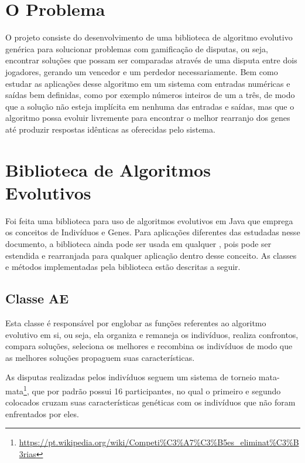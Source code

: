 \section{O Problema}

O projeto consiste do desenvolvimento de uma biblioteca de algoritmo evolutivo genérica para solucionar problemas com gamificação de disputas, ou seja, encontrar soluções que possam ser comparadas através de uma disputa entre dois jogadores, gerando um vencedor e um perdedor necessariamente. Bem como estudar as aplicações desse algoritmo em um sistema com entradas numéricas e saídas bem definidas, como por exemplo números inteiros de um a três, de modo que a solução não esteja implícita em nenhuma das entradas e saídas, mas que o algoritmo possa evoluir livremente para encontrar o melhor rearranjo dos genes até produzir respostas idênticas as oferecidas pelo sistema.

\section{Biblioteca de Algoritmos Evolutivos}

Foi feita uma biblioteca para uso de algoritmos evolutivos em Java que emprega os conceitos de Indivíduos e Genes. Para aplicações diferentes das estudadas nesse documento, a biblioteca ainda pode ser usada em qualquer \SE, pois pode ser estendida e rearranjada para qualquer aplicação dentro desse conceito. As classes e métodos implementadas pela biblioteca estão descritas a seguir.

\subsection{Classe AE}

Esta classe é responsável por englobar as funções referentes ao algoritmo evolutivo em si, ou seja, ela organiza e remaneja os indivíduos, realiza confrontos, compara soluções, seleciona os melhores e recombina os indivíduos de modo que as melhores soluções propaguem suas características.

As disputas realizadas pelos indivíduos seguem um sistema de torneio mata-mata\footnote{\url{https://pt.wikipedia.org/wiki/Competi\%C3\%A7\%C3\%B5es_eliminat\%C3\%B3rias}}, que por padrão possui 16 participantes, no qual o primeiro e segundo colocados cruzam suas características genéticas com os indivíduos que não foram enfrentados por eles.


